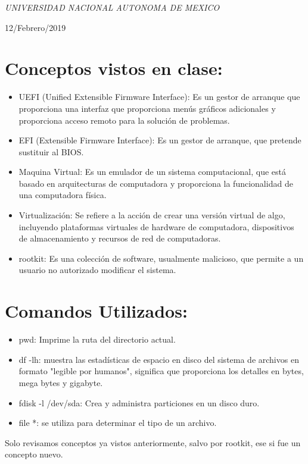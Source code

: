 \documentclass[a4paper, 11pt, oneside]{article}
\begin{document}
\begin{titlepage}
	\textit{UNIVERSIDAD NACIONAL AUTONOMA DE MEXICO} 
	
	\vfill
	
	
	
	
	\vspace{0.3\baselineskip} 
	
	12/Febrero/2019 
	
	 

\end{titlepage}

\section*{Conceptos vistos en clase:}
\begin{itemize}
 \item UEFI (Unified Extensible Firmware Interface): Es un gestor de arranque que proporciona una interfaz que proporciona menús gráficos adicionales y proporciona acceso remoto para la solución de problemas.
 \item EFI (Extensible Firmware Interface): Es un gestor de arranque, que pretende sustituir al BIOS.
 \item Maquina Virtual: Es un emulador de un sistema computacional, que está basado en arquitecturas de computadora y proporciona la funcionalidad de una computadora física.
 \item Virtualización: Se refiere a la acción de crear una versión virtual de algo, incluyendo plataformas virtuales de hardware de computadora, dispositivos de almacenamiento y recursos de red de computadoras.
 \item rootkit: Es una colección de software, usualmente malicioso, que permite a un usuario no autorizado modificar el sistema.
\end{itemize}

\section*{Comandos Utilizados:}
\begin{itemize}
 \item pwd: Imprime la ruta del directorio actual.
 \item df -lh: muestra las estadísticas de espacio en disco del sistema de archivos en formato "legible por humanos", significa que proporciona los detalles en bytes, mega bytes y gigabyte.
 \item fdisk -l /dev/sda: Crea y administra particiones en un disco duro.
 \item file *: se utiliza para determinar el tipo de un archivo.

\end{itemize}

Solo revisamos conceptos ya vistos anteriormente, salvo por rootkit, ese si fue un concepto nuevo.
\end{document}
